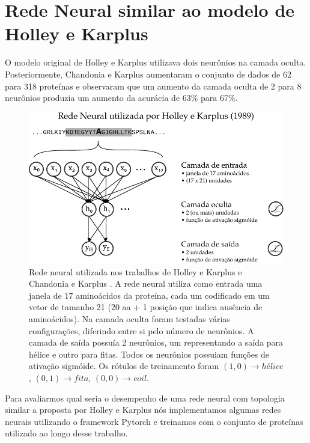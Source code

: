 \section{Rede Neural similar ao modelo de Holley e Karplus}

O modelo original de Holley e Karplus \citeyear{key} utilizava dois neurônios na camada oculta. Posteriormente, Chandonia e Karplus \citeyear{10.1002/pro.5560050422} aumentaram o conjunto de dados de 62 para 318 proteínas e observaram que um aumento da camada oculta de 2 para 8 neurônios produzia um aumento da acurácia de 63\% para 67\%.

\begin{figure}
    \includegraphics[width=\linewidth]{../figures/neural_network_HK.pdf}
    \caption{Rede neural utilizada nos trabalhos de Holley e Karplus \citeyear{key} e Chandonia e Karplus \citeyear{10.1002/pro.5560050422}. A rede neural utiliza como entrada uma janela de 17 aminoácidos da proteína, cada um codificado em um vetor de tamanho 21 (20 aa + 1 posição que indica ausência de aminoácidos). Na camada oculta foram testadas várias configurações, diferindo entre si pelo número de neurônios. A camada de saída possuía 2 neurônios, um representando a saída para hélice e outro para fitas. Todos os neurônios possuiam funções de ativação sigmóide. Os rótulos de treinamento foram $(1,0) \rightarrow hélice$, $(0,1) \rightarrow fita$, $(0,0) \rightarrow coil$.}
    \label{fig:neural_network_HK}
\end{figure}

Para avaliarmos qual seria o desempenho de uma rede neural com topologia similar a proposta por Holley e Karplus \citeyear{key} nós implementamos algumas redes neurais utilizando o framework Pytorch e treinamos com o conjunto de proteínas utilizado ao longo desse trabalho.

